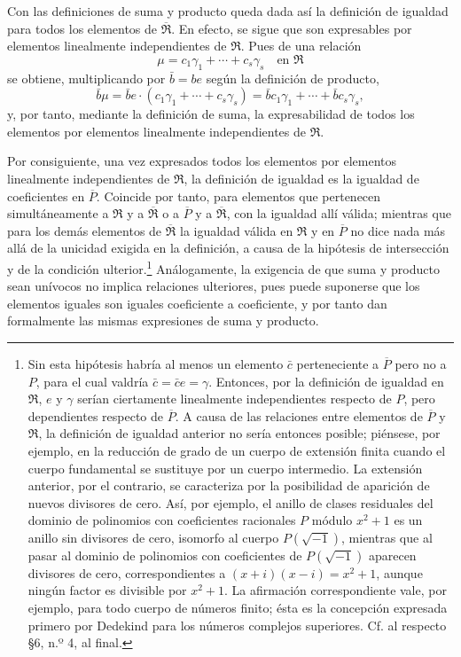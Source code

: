 \documentclass[11pt]{article}
\begin{document}
Con las definiciones de suma y producto queda dada así la definición de igualdad para todos los elementos de $\overline{\mathfrak R}$. En efecto, se sigue que son expresables por elementos linealmente independientes de $\mathfrak R$. Pues de una relación
\[
  \mu=c_1\gamma_1+\cdots+c_s\gamma_s\quad\text{en }\mathfrak R
\]
se obtiene, multiplicando por $\bar b=be$ según la definición de producto,
\[
  \bar b\mu=\bar b e\cdot(c_1\gamma_1+\cdots+c_s\gamma_s)
  =\bar b c_1\gamma_1+\cdots+\bar b c_s\gamma_s,
\]
y, por tanto, mediante la definición de suma, la expresabilidad de todos los elementos por elementos linealmente independientes de $\mathfrak R$.

Por consiguiente, una vez expresados todos los elementos por elementos linealmente independientes de $\mathfrak R$, la definición de igualdad es la igualdad de coeficientes en $\overline P$. Coincide por tanto, para elementos que pertenecen simultáneamente a $\mathfrak R$ y a $\overline{\mathfrak R}$ o a $\overline P$ y a $\overline{\mathfrak R}$, con la igualdad allí válida; mientras que para los demás elementos de $\overline{\mathfrak R}$ la igualdad válida en $\mathfrak R$ y en $\overline P$ no dice nada más allá de la unicidad exigida en la definición, a causa de la hipótesis de intersección y de la condición ulterior.\footnote{Sin esta hipótesis habría al menos un elemento $\bar c$ perteneciente a $\overline P$ pero no a $P$, para el cual valdría $\bar c=\bar c e=\gamma$. Entonces, por la definición de igualdad en $\mathfrak R$, $e$ y $\gamma$ serían ciertamente linealmente independientes respecto de $P$, pero dependientes respecto de $\overline P$. A causa de las relaciones entre elementos de $\overline P$ y $\mathfrak R$, la definición de igualdad anterior no sería entonces posible; piénsese, por ejemplo, en la reducción de grado de un cuerpo de extensión finita cuando el cuerpo fundamental se sustituye por un cuerpo intermedio. La extensión anterior, por el contrario, se caracteriza por la posibilidad de aparición de nuevos divisores de cero. Así, por ejemplo, el anillo de clases residuales del dominio de polinomios con coeficientes racionales $P$ módulo $x^2+1$ es un anillo sin divisores de cero, isomorfo al cuerpo $P(\sqrt{-1})$, mientras que al pasar al dominio de polinomios con coeficientes de $P(\sqrt{-1})$ aparecen divisores de cero, correspondientes a $(x+i)(x-i)=x^2+1$, aunque ningún factor es divisible por $x^2+1$. La afirmación correspondiente vale, por ejemplo, para todo cuerpo de números finito; ésta es la concepción expresada primero por Dedekind para los números complejos superiores. Cf. al respecto \S 6, n.º 4, al final.} Análogamente, la exigencia de que suma y producto sean unívocos no implica relaciones ulteriores, pues puede suponerse que los elementos iguales son iguales coeficiente a coeficiente, y por tanto dan formalmente las mismas expresiones de suma y producto.
\end{document}
